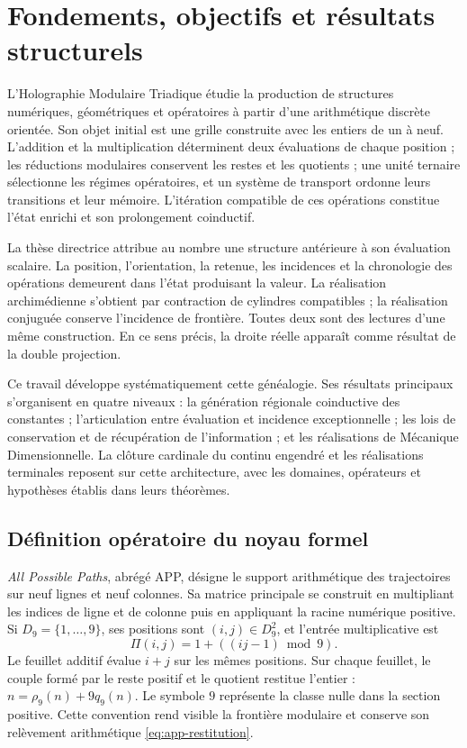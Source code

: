\chapter*{Fondements, objectifs et résultats structurels}
\label{hmt:sistematica:presentacion}

L’Holographie Modulaire Triadique étudie la production de structures numériques, géométriques et opératoires à partir d’une arithmétique discrète orientée. Son objet initial est une grille construite avec les entiers de un à neuf. L’addition et la multiplication déterminent deux évaluations de chaque position ; les réductions modulaires conservent les restes et les quotients ; une unité ternaire sélectionne les régimes opératoires, et un système de transport ordonne leurs transitions et leur mémoire. L’itération compatible de ces opérations constitue l’état enrichi et son prolongement coinductif.

La thèse directrice attribue au nombre une structure antérieure à son évaluation scalaire. La position, l’orientation, la retenue, les incidences et la chronologie des opérations demeurent dans l’état produisant la valeur. La réalisation archimédienne s’obtient par contraction de cylindres compatibles ; la réalisation conjuguée conserve l’incidence de frontière. Toutes deux sont des lectures d’une même construction. En ce sens précis, la droite réelle apparaît comme résultat de la double projection.

Ce travail développe systématiquement cette généalogie. Ses résultats principaux s’organisent en quatre niveaux : la génération régionale coinductive des constantes ; l’articulation entre évaluation et incidence exceptionnelle ; les lois de conservation et de récupération de l’information ; et les réalisations de Mécanique Dimensionnelle. La clôture cardinale du continu engendré et les réalisations terminales reposent sur cette architecture, avec les domaines, opérateurs et hypothèses établis dans leurs théorèmes.

\section*{Définition opératoire du noyau formel}

\emph{All Possible Paths}, abrégé APP, désigne le support arithmétique des trajectoires sur neuf lignes et neuf colonnes. Sa matrice principale se construit en multipliant les indices de ligne et de colonne puis en appliquant la racine numérique positive. Si \(D_9=\{1,\ldots,9\}\), ses positions sont \((i,j)\in D_9^2\), et l’entrée multiplicative est
\[
 \Pi(i,j)=1+((ij-1)\bmod9).
\]
Le feuillet additif évalue \(i+j\) sur les mêmes positions. Sur chaque feuillet, le couple formé par le reste positif et le quotient restitue l’entier : \(n=\rho_9(n)+9q_9(n)\). Le symbole \(9\) représente la classe nulle dans la section positive. Cette convention rend visible la frontière modulaire et conserve son relèvement arithmétique \eqref{eq:app-restitution}.

